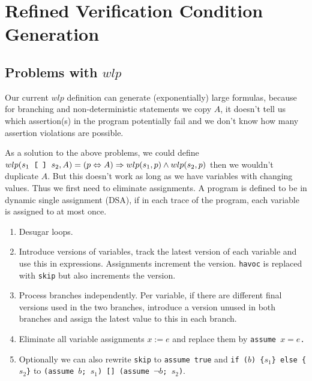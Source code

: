 \section{Refined Verification Condition Generation}
\subsection{Problems with $wlp$}
\begin{mytitle} Our current $wlp$ definition can generate (exponentially) large formulas, because for branching and non-deterministic statements we copy $A$, it doesn't tell us which assertion(s) in the program potentially fail and we don't know how many assertion violations are possible. 
\end{mytitle}
\begin{mytitle} As a solution to the above problems, we could define $wlp(\texttt{$s_1$ [ ] $s_2$}, A) = (p\Leftrightarrow A) \Rightarrow wlp(s_1, p) \land wlp(s_2, p)$ then we wouldn't duplicate $A$. But this doesn't work as long as we have variables with changing values. Thus we first need to eliminate assignments. A program is defined to be in dynamic single assignment (DSA), if in each trace of the program, each variable is assigned to at most once. 
\end{mytitle}
\begin{mytitle}\hfill
\begin{enumerate}
    \item Desugar loops.
    \item Introduce versions of variables, track the latest version of each variable and use this in expressions. Assignments increment the version. \texttt{havoc} is replaced with \texttt{skip} but also increments the version.
    \item Process branches independently. Per variable, if there are different final versions used in the two branches, introduce a version unused in both branches and assign the latest value to this in each branch.
    \item Eliminate all variable assignments \texttt{$x:= e$} and replace them by \texttt{assume $x=e$.}
    \item Optionally we can also rewrite \texttt{skip} to \texttt{assume true} and \texttt{if ($b$) \{$s_1$\} else \{$s_2$\}} to \texttt{(assume $b$; $s_1$) [] (assume $\lnot b$; $s_2$)}.
\end{enumerate}
\end{mytitle}

